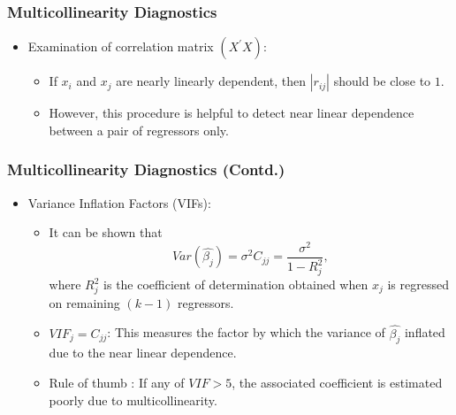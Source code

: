 \documentclass[10pt]{beamer} %
\begin{document}
\begin{frame}
   \frametitle{Multicollinearity Diagnostics}
   \begin{itemize}
      \item Examination of correlation matrix $(X^{'}X)$:
         \begin{itemize}
            \item If $x_{i}$ and $x_{j}$ are nearly linearly dependent, then
               $|r_{ij}|$ should be close to $1$.
               \vspace{0.25cm}
            \item However, this procedure is helpful to detect near linear
               dependence between a pair of regressors only.
         \end{itemize}
   \end{itemize}
\end{frame}

\begin{frame}
   \frametitle{Multicollinearity Diagnostics (Contd.)}
   \begin{itemize}
      \item Variance Inflation Factors (VIFs):
         \begin{itemize}
            \item It can be shown that
               $$Var(\hat{\beta_j}) = \sigma^2 C_{jj}=\frac{\sigma^2}{1-R_{j}^2},$$
               where $R_{j}^2$ is the coefficient of determination obtained when
               $x_{j}$ is regressed on remaining $(k-1)$ regressors.
               \vspace{0.25cm}
            \item $VIF_{j}=C_{jj}$: This measures the factor by
               which the variance of $\hat{\beta_{j}}$ inflated due to the near
               linear dependence.
               \vspace{0.25cm}
            \item Rule of thumb : If any of $VIF>5$, the associated coefficient
               is estimated poorly due to multicollinearity.
         \end{itemize}
   \end{itemize}
\end{frame}
\end{document}
